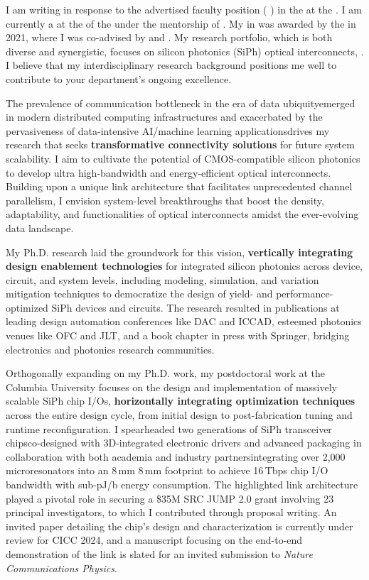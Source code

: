 I am writing in response to the advertised faculty position (\textbf{\appPosition{} \appJobID}) in the \appDept{} at the \appSchool{}. I am currently a \myTitle{} at the \myDept{} of the \mySchoolShort{} under the mentorship of \mySuper{}. My \myDegree{} in \myMajor{} was awarded by the \myPhDSchool{} in 2021, where I was co-advised by \myAdvisor{} and \myCoAdvisor{}. My research portfolio, which is both diverse and synergistic, focuses on silicon photonics (SiPh) optical interconnects, \appSpecific{}. I believe that my interdisciplinary research background positions me well to contribute to your department's ongoing excellence.

The prevalence of communication bottleneck in the era of data ubiquity\textemdash emerged in modern distributed computing infrastructures and exacerbated by the pervasiveness of data-intensive AI/machine learning applications\textemdash drives my research that seeks \textbf{transformative connectivity solutions} for future system scalability. I aim to cultivate the potential of CMOS-compatible silicon photonics to develop ultra high-bandwidth and energy-efficient optical interconnects. Building upon a unique link architecture that facilitates unprecedented channel parallelism, I envision system-level breakthroughs that boost the density, adaptability, and functionalities of optical interconnects amidst the ever-evolving data landscape.

My Ph.D. research laid the groundwork for this vision, \textbf{vertically integrating design enablement technologies} for integrated silicon photonics across device, circuit, and system levels, including modeling, simulation, and variation mitigation techniques to democratize the design of yield- and performance-optimized SiPh devices and circuits. The research resulted in publications at leading design automation conferences like DAC and ICCAD, esteemed photonics venues like OFC and JLT, and a book chapter in press with Springer, bridging electronics and photonics research communities.

Orthogonally expanding on my Ph.D. work, my postdoctoral work at the Columbia University focuses on the design and implementation of massively scalable SiPh chip I/Os, \textbf{horizontally integrating optimization techniques} across the entire design cycle, from initial design to post-fabrication tuning and runtime reconfiguration. I spearheaded two generations of SiPh transceiver chips\textemdash co-designed with 3D-integrated electronic drivers and advanced packaging in collaboration with both academia and industry partners\textemdash integrating over 2,000 microresonators into an 8\,mm \texttimes{} 8\,mm footprint to achieve 16\,Tbps chip I/O bandwidth with sub-pJ/b energy consumption. The highlighted link architecture played a pivotal role in securing a \$35M SRC JUMP 2.0 grant involving 23 principal investigators, to which I contributed through proposal writing. An invited paper detailing the chip's design and characterization is currently under review for CICC 2024, and a manuscript focusing on the end-to-end demonstration of the link is slated for an invited submission to \emph{Nature Communications Physics}.

